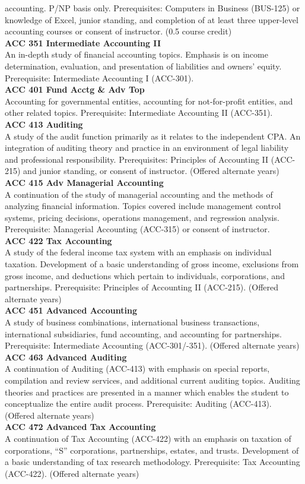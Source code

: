 \documentclass[
  letterpaper,
]{scrbook}
\begin{document}
accounting. P/NP basis only. Prerequisites: Computers in Business
(BUS-125) or knowledge of Excel, junior standing, and completion of at
least three upper-level accounting courses or consent of instructor.
(0.5 course credit)\\
\textbf{ACC 351 Intermediate Accounting II}\\
An in-depth study of financial accounting topics. Emphasis is on income
determination, evaluation, and presentation of liabilities and owners'
equity. Prerequisite: Intermediate Accounting I (ACC-301).\\
\textbf{ACC 401 Fund Acctg \& Adv Top}\\
Accounting for governmental entities, accounting for not-for-profit
entities, and other related topics. Prerequisite: Intermediate
Accounting II (ACC-351).\\
\textbf{ACC 413 Auditing}\\
A study of the audit function primarily as it relates to the independent
CPA. An integration of auditing theory and practice in an environment of
legal liability and professional responsibility. Prerequisites:
Principles of Accounting II (ACC-215) and junior standing, or consent of
instructor. (Offered alternate years)\\
\textbf{ACC 415 Adv Managerial Accounting}\\
A continuation of the study of managerial accounting and the methods of
analyzing financial information. Topics covered include management
control systems, pricing decisions, operations management, and
regression analysis. Prerequisite: Managerial Accounting (ACC-315) or
consent of instructor.\\
\textbf{ACC 422 Tax Accounting}\\
A study of the federal income tax system with an emphasis on individual
taxation. Development of a basic understanding of gross income,
exclusions from gross income, and deductions which pertain to
individuals, corporations, and partnerships. Prerequisite: Principles of
Accounting II (ACC-215). (Offered alternate years)\\
\textbf{ACC 451 Advanced Accounting}\\
A study of business combinations, international business transactions,
international subsidiaries, fund accounting, and accounting for
partnerships. Prerequisite: Intermediate Accounting (ACC-301/-351).
(Offered alternate years)\\
\textbf{ACC 463 Advanced Auditing}\\
A continuation of Auditing (ACC-413) with emphasis on special reports,
compilation and review services, and additional current auditing topics.
Auditing theories and practices are presented in a manner which enables
the student to conceptualize the entire audit process. Prerequisite:
Auditing (ACC-413). (Offered alternate years)\\
\textbf{ACC 472 Advanced Tax Accounting}\\
A continuation of Tax Accounting (ACC-422) with an emphasis on taxation
of corporations, ``S'' corporations, partnerships, estates, and trusts.
Development of a basic understanding of tax research methodology.
Prerequisite: Tax Accounting (ACC-422). (Offered alternate years)
\end{document}
